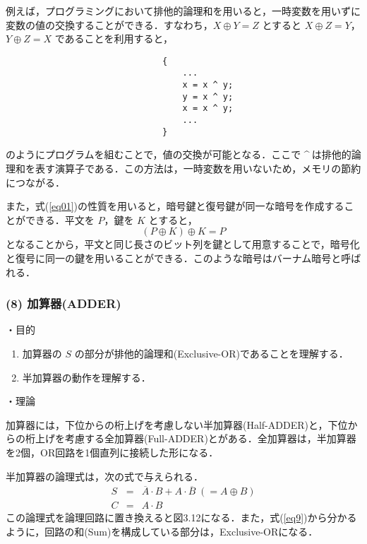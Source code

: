 例えば，プログラミングにおいて排他的論理和を用いると，一時変数を用いずに変数の値の交換することができる．すなわち，$X \oplus Y = Z$ とすると $X \oplus Z = Y$，$Y \oplus Z = X$ であることを利用すると，
\begin{center}
    \begin{verbatim}
                               {
                                   ...
                                   x = x ^ y;
                                   y = x ^ y;
                                   x = x ^ y;
                                   ...
                               }
    \end{verbatim}
\end{center}
のようにプログラムを組むことで，値の交換が可能となる．ここで \textasciicircum$\:$は排他的論理和を表す演算子である．この方法は，一時変数を用いないため，メモリの節約につながる．

また，式(\ref{eq01})の性質を用いると，暗号鍵と復号鍵が同一な暗号を作成することができる．平文を $P$，鍵を $K$ とすると，
$$
    (P \oplus K) \oplus K = P
$$
となることから，平文と同じ長さのビット列を鍵として用意することで，暗号化と復号に同一の鍵を用いることができる．このような暗号はバーナム暗号と呼ばれる．

\subsubsection*{(8) 加算器(ADDER)}
\noindent
・目的 \vspace{2mm}

\begin{enumerate}
    \item 加算器の $S$ の部分が排他的論理和(Exclusive-OR)であることを理解する．
    \item 半加算器の動作を理解する．
\end{enumerate}

\vspace{7mm}
\noindent
・理論 \vspace{2mm}

加算器には，下位からの桁上げを考慮しない半加算器(Half-ADDER)と，下位からの桁上げを考慮する全加算器(Full-ADDER)とがある．全加算器は，半加算器を2個，OR回路を1個直列に接続した形になる．

半加算器の論理式は，次の式で与えられる．
\begin{eqnarray}
    S &=& \overline{A} \cdot B + A \cdot \overline{B} \; (= A \oplus B) \label{eq9} \\
    C &=& A \cdot B \label{eq10}
\end{eqnarray}
この論理式を論理回路に置き換えると図3.12になる．また，式(\ref{eq9})から分かるように，回路の和(Sum)を構成している部分は，Exclusive-ORになる．

